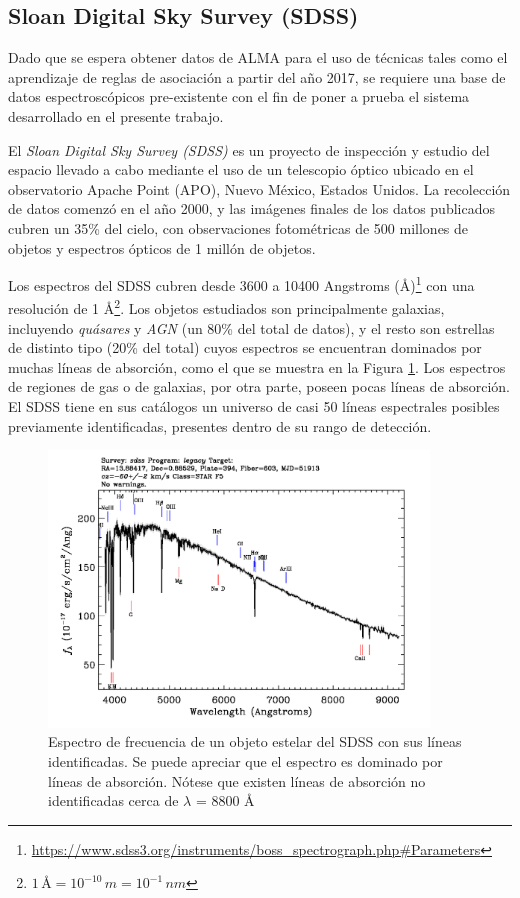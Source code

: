 \subsection{Sloan Digital Sky Survey (SDSS)}

Dado que se espera obtener datos de ALMA para el uso de técnicas tales como el aprendizaje de reglas de asociación a partir del año 2017, se requiere una base de datos espectroscópicos pre-existente con el fin de poner a prueba el sistema desarrollado en el presente trabajo.

El \textit{Sloan Digital Sky Survey (SDSS)}\cite{york2000sloan} es un proyecto de inspección y estudio del espacio llevado a cabo mediante el uso de un telescopio óptico ubicado en el observatorio Apache Point (APO), Nuevo México, Estados Unidos. La recolección de datos comenzó en el año 2000, y las imágenes finales de los datos publicados cubren un 35\% del cielo, con observaciones fotométricas de 500 millones de objetos y espectros ópticos de 1 millón de objetos.

Los espectros del SDSS cubren desde 3600 a 10400 Angstroms ({\AA})\footnote{\url{https://www.sdss3.org/instruments/boss_spectrograph.php\#Parameters}} con una resolución de 1 {\AA}\footnote{$1\,\text{{\AA}} = 10^{-10}\,m = 10^{-1}\,nm$}. Los objetos estudiados son principalmente galaxias, incluyendo \textit{quásares} y \textit{AGN} (un 80\% del total de datos), y el resto son estrellas de distinto tipo (20\% del total) cuyos espectros se encuentran dominados por muchas líneas de absorción, como el que se muestra en la Figura \ref{fig:sdss_spec}. Los espectros de regiones de gas o de galaxias, por otra parte, poseen pocas líneas de absorción. El SDSS tiene en sus catálogos un universo de casi 50 líneas espectrales posibles previamente identificadas, presentes dentro de su rango de detección.

\begin{figure}[h!]
\begin{center}
\includegraphics[width=0.9\textwidth]{imagenes/sdss_spec.png}
\end{center}
\vspace*{-5mm}
\caption{Espectro de frecuencia de un objeto estelar del SDSS con sus líneas identificadas. Se puede apreciar que el espectro es dominado por líneas de absorción. Nótese que existen líneas de absorción no identificadas cerca de $\lambda$ = 8800 {\AA}}
\label{fig:sdss_spec}
\end{figure}


